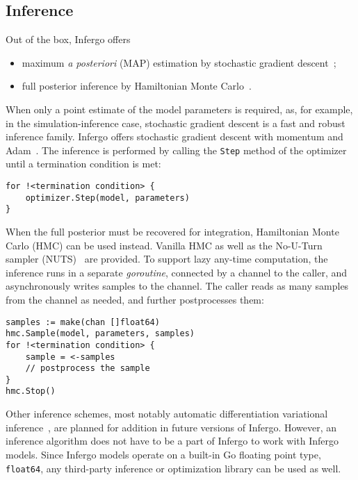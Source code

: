\documentclass[sigplan,review,10pt,anonymous]{acmart}
\begin{document}
\begin{sloppypar}
\subsection{Inference}

Out of the box, Infergo offers 
\begin{itemize}
	\item maximum \textit{a posteriori} (MAP) estimation by stochastic
		gradient descent~\cite{R16}; 
	\item full posterior inference by Hamiltonian Monte
		Carlo~\cite{N12,HG11}.
\end{itemize}

When only a point estimate of the model parameters is required,
as, for example, in the simulation-inference case, stochastic
gradient descent is a fast and robust inference family. Infergo
offers stochastic gradient descent with momentum and
Adam~\cite{KB15}.  The inference is performed by calling the
\lstinline{Step} method of the optimizer until a termination
condition is met:
\begin{lstlisting}
for !<termination condition> {
    optimizer.Step(model, parameters)
}
\end{lstlisting}

When the full posterior must be recovered for integration,
Hamiltonian Monte Carlo (HMC) can be used instead. Vanilla HMC
as well as the No-U-Turn sampler (NUTS)~\cite{HG11} are
provided. To support lazy any-time computation, the inference
runs in a separate \textit{goroutine}, connected by a channel to
the caller, and asynchronously writes samples to the channel.
The caller reads as many samples from the channel as needed, and
further postprocesses them:
\begin{lstlisting}
samples := make(chan []float64)
hmc.Sample(model, parameters, samples)
for !<termination condition> {
	sample = <-samples
	// postprocess the sample
}
hmc.Stop()
\end{lstlisting}

Other inference schemes, most notably automatic differentiation
variational inference~\cite{KTR+17}, are planned for addition
in future versions of Infergo. However, an inference algorithm
does not have to be a part of Infergo to work with Infergo
models. Since Infergo models operate on a built-in Go floating
point type, \lstinline{float64}, any third-party inference or
optimization library can be used as well. 


\end{sloppypar}
\end{document}
